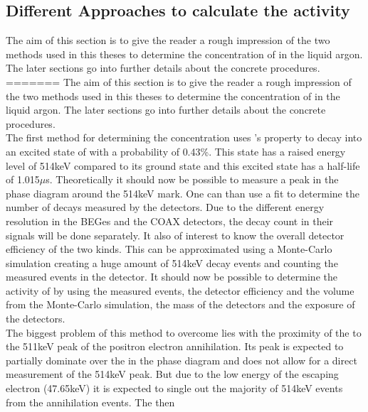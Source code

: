 \subsection{Different Approaches to calculate the activity}
\label{sec:Appro}


The aim of this section is to give the reader a rough impression of the two methods used in this theses to determine the concentration of  in the liquid argon. The later sections go into further details about the concrete procedures.\\
=======
The aim of this section is to give the reader a rough impression of the two methods used in this theses to determine the concentration of  in the liquid argon. The later sections go into further details about the concrete procedures.\\

The first method for determining the concentration uses 's property to decay into an excited state of  with a probability of 0.43\%. This state has a raised energy level of 514keV compared to its ground state and this excited state has a half-life of 1.015\(\mu\)s. Theoretically it should now be possible to measure a peak in the phase diagram around the 514keV mark. One can than use a fit to determine the number of decays measured by the detectors. Due to the different energy resolution in the BEGes and the COAX detectors, the decay count in their signals will be done separately. It also of interest to know the overall detector efficiency of the two kinds. This can be approximated using a Monte-Carlo simulation creating a huge amount of 514keV decay events and counting the measured events in the detector.  It should now be possible to determine the activity of  by using the measured events, the detector efficiency and the volume from the Monte-Carlo simulation, the mass of the detectors and the exposure of the detectors.\\

The biggest problem of this method to overcome lies with the proximity of the  to the 511keV peak of the positron electron annihilation. Its peak is expected to partially dominate over the  in the phase diagram and does not allow for a direct measurement of the 514keV peak. But due to the low energy of the escaping electron (47.65keV) it is expected to single out the majority of 514keV events from the annihilation events. The then \\

